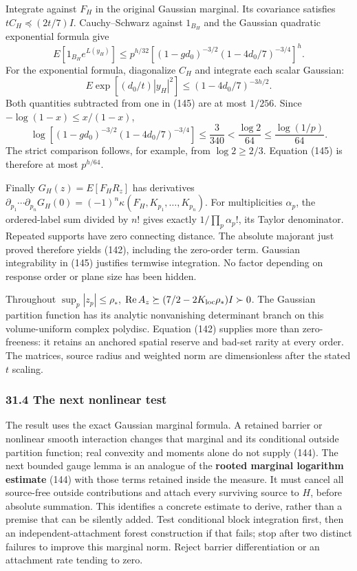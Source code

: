 \documentclass[11pt,a4paper]{article}
\begin{document}
Integrate against \(F_H\) in the original Gaussian marginal. Its
covariance satisfies \(tC_H\preceq(2t/7)I\). Cauchy--Schwarz against
\(1_{B_H}\) and the Gaussian quadratic exponential formula give
\[E[1_{B_H}e^{L(y_H)}]
\le p^{h/32}
 \left[(1-gd_0)^{-3/2}(1-4d_0/7)^{-3/4}\right]^h.
\tag{145}\] For the exponential formula, diagonalize \(C_H\) and
integrate each scalar Gaussian:
\[E\exp[(d_0/t)|y_H|^2]\le(1-4d_0/7)^{-3h/2}.\] Both quantities
subtracted from one in (145) are at most \(1/256\). Since
\(-\log(1-x)\le x/(1-x)\),
\[\log\left[(1-gd_0)^{-3/2}(1-4d_0/7)^{-3/4}\right]
\le\frac3{340}<\frac{\log2}{64}\le\frac{\log(1/p)}{64}.\] The strict
comparison follows, for example, from \(\log2\ge2/3\). Equation (145) is
therefore at most \(p^{h/64}\).

Finally \(G_H(z)=E[F_HR_z]\) has derivatives
\(\partial_{p_1}\cdots\partial_{p_n}G_H(0) =(-1)^n\kappa(F_H,K_{p_1},\ldots,K_{p_n})\).
For multiplicities \(\alpha_p\), the ordered-label sum divided by \(n!\)
gives exactly \(1/\prod_p\alpha_p!\), its Taylor denominator. Repeated
supports have zero connecting distance. The absolute majorant just
proved therefore yields (142), including the zero-order term. Gaussian
integrability in (145) justifies termwise integration. No factor
depending on response order or plane size has been hidden.

Throughout \(\sup_p|z_p|\le\rho_*\),
\(\operatorname{Re}A_z\succeq(7/2-2K_{\rm loc}\rho_*)I\succ0\). The
Gaussian partition function has its analytic nonvanishing determinant
branch on this volume-uniform complex polydisc. Equation (142) supplies
more than zero-freeness: it retains an anchored spatial reserve and
bad-set rarity at every order. The matrices, source radius and weighted
norm are dimensionless after the stated \(t\) scaling.

\hypertarget{the-next-nonlinear-test}{%
\subsubsection{31.4 The next nonlinear
test}\label{the-next-nonlinear-test}}

The result uses the exact Gaussian marginal formula. A retained barrier
or nonlinear smooth interaction changes that marginal and its
conditional outside partition function; real convexity and moments alone
do not supply (144). The next bounded gauge lemma is an analogue of the
\textbf{rooted marginal logarithm estimate} (144) with those terms
retained inside the measure. It must cancel all source-free outside
contributions and attach every surviving source to \(H\), before
absolute summation. This identifies a concrete estimate to derive,
rather than a premise that can be silently added. Test conditional block
integration first, then an independent-attachment forest construction if
that fails; stop after two distinct failures to improve this marginal
norm. Reject barrier differentiation or an attachment rate tending to
zero.
\end{document}
